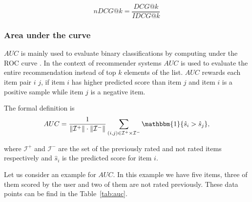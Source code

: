 $$nDCG@k=\frac{DCG@k}{IDCG@k}$$

\subsubsection{Area under the curve}
$AUC$ is mainly used to evaluate binary classifications by computing  under
the ROC curve \cite{prati2008evaluating}. In the context of recommender systems $AUC$ is used to evaluate the
entire recommendation instead of top $k$ elements of the list. $AUC$ rewards each item pair $i$ $j$, if
item $i$ has higher predicted score than item $j$ and item $i$ is a positive sample while item
$j$ is a negative item.

The formal definition is
\begin{equation} \label{eq:auc}
     AUC=\frac{1}{\|\mathcal{I}^{+}\|\cdot\|\mathcal{I}^-\|}
\sum_{(i,j)\in\mathcal{I}^+\times\mathcal{I}^-}\mathbbm{1} \{\hat{s}_i > \hat{s}_j \}, 
\end{equation}

where $\mathcal{I}^+$ and $\mathcal{I}^{-}$ are the set of the previously rated and not rated items respectively and $\hat{s}_i$ is the predicted score for item $i$. 

Let us consider an example for $AUC$. In this example we have five items, three of them scored by
the user and two of them are not rated previously. These data points can be find in the Table~\ref{tab:auc}.

